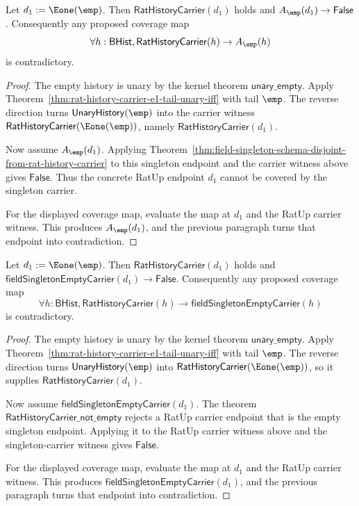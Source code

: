 \begin{theorem}
\label{thm:field-rat-carrier-has-non-singleton-boundary-witness}
Let $d_1:=\Eone(\emp)$. Then $\mathsf{RatHistoryCarrier}(d_1)$ holds and
$A_{\emp}(d_1)\to\mathsf{False}$. Consequently any proposed coverage map
$$
\forall h:\mathsf{BHist},\mathsf{RatHistoryCarrier}(h)\to A_{\emp}(h)
$$
is contradictory.
\end{theorem}
\begin{proof}
The empty history is unary by the kernel theorem $\mathsf{unary\_empty}$.
Apply Theorem~\ref{thm:rat-history-carrier-e1-tail-unary-iff} with tail
$\emp$. The reverse direction turns $\mathsf{UnaryHistory}(\emp)$ into the
carrier witness $\mathsf{RatHistoryCarrier}(\Eone(\emp))$, namely
$\mathsf{RatHistoryCarrier}(d_1)$.

Now assume $A_{\emp}(d_1)$. Applying
Theorem~\ref{thm:field-singleton-schema-disjoint-from-rat-history-carrier} to
this singleton endpoint and the carrier witness above gives $\mathsf{False}$.
Thus the concrete RatUp endpoint $d_1$ cannot be covered by the singleton
carrier.

For the displayed coverage map, evaluate the map at $d_1$ and the RatUp carrier
witness. This produces $A_{\emp}(d_1)$, and the previous paragraph turns that
endpoint into contradiction.
\end{proof}

\begin{theorem}
\label{thm:field-rat-history-carrier-has-non-singleton-boundary-witness}
Let $d_1:=\Eone(\emp)$. Then $\mathsf{RatHistoryCarrier}(d_1)$ holds and
$\mathsf{fieldSingletonEmptyCarrier}(d_1)\to\mathsf{False}$.
Consequently any proposed coverage map
$$
\forall h:\mathsf{BHist},\mathsf{RatHistoryCarrier}(h)\to
\mathsf{fieldSingletonEmptyCarrier}(h)
$$
is contradictory.
\end{theorem}
\begin{proof}
The empty history is unary by the kernel theorem $\mathsf{unary\_empty}$.
Apply Theorem~\ref{thm:rat-history-carrier-e1-tail-unary-iff} with tail
$\emp$. The reverse direction turns $\mathsf{UnaryHistory}(\emp)$ into
$\mathsf{RatHistoryCarrier}(\Eone(\emp))$, so it supplies
$\mathsf{RatHistoryCarrier}(d_1)$.

Now assume $\mathsf{fieldSingletonEmptyCarrier}(d_1)$. The theorem
$\mathsf{RatHistoryCarrier\_not\_empty}$ rejects a RatUp carrier endpoint that is
the empty singleton endpoint. Applying it to the RatUp carrier witness above and
the singleton-carrier witness gives $\mathsf{False}$.

For the displayed coverage map, evaluate the map at $d_1$ and the RatUp carrier
witness. This produces $\mathsf{fieldSingletonEmptyCarrier}(d_1)$, and the
previous paragraph turns that endpoint into contradiction.
\end{proof}

